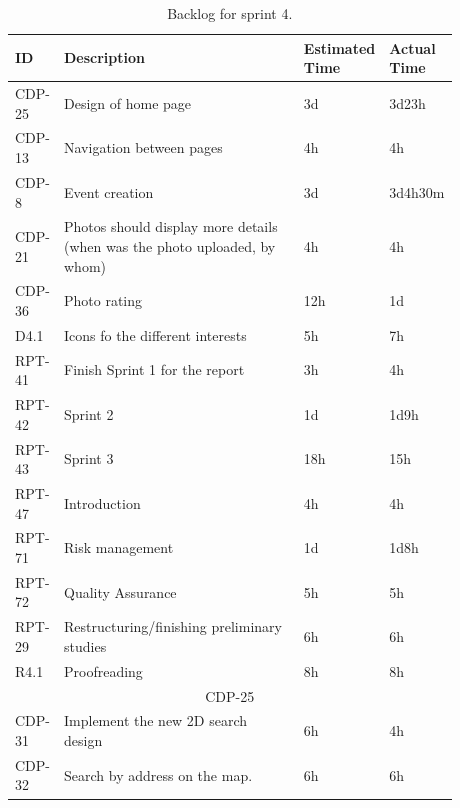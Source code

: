 \begin{landscape}
\setlength{\tabcolsep}{12pt}
\begin{table}[htbp]
\centering
{}
\begin{tabular}{|p{0.08\linewidth}|p{0.6\linewidth}|p{0.1\linewidth}|p{0.1\linewidth}|}
\hline
\cellcolor{gray!25} ID & \cellcolor{gray!25} Description & \cellcolor{gray!25} Estimated Time & \cellcolor{gray!25} Actual Time \\
\hline
CDP-25 & Design of home page & 3d & 3d23h \\
CDP-13 & Navigation between pages & 4h & 4h \\
CDP-8 & Event creation & 3d & 3d4h30m \\
CDP-21 & Photos should display more details (when was the photo uploaded, by whom) & 4h & 4h \\ 
CDP-36 & Photo rating & 12h & 1d \\
D4.1 & Icons fo the different interests & 5h & 7h \\
RPT-41 & Finish Sprint 1 for the report & 3h & 4h \\
RPT-42 & Sprint 2 & 1d & 1d9h \\
RPT-43 & Sprint 3 & 18h & 15h \\
RPT-47 & Introduction & 4h & 4h \\
RPT-71 & Risk management & 1d & 1d8h \\
RPT-72 & Quality Assurance & 5h & 5h \\
RPT-29 & Restructuring/finishing preliminary studies & 6h & 6h \\
R4.1 & Proofreading & 8h & 8h \\
%
\hline
\multicolumn{4}{|c|}{\cellcolor{gray!25} CDP-25} \\
\hline
CDP-31 & Implement the new 2D search design & 6h & 4h \\
CDP-32 & Search by address on the map. & 6h & 6h \\
\hline
\end{tabular}
\caption{Backlog for sprint 4.}
\label{tab:S5Backlog}
\end{table}
\end{landscape}



